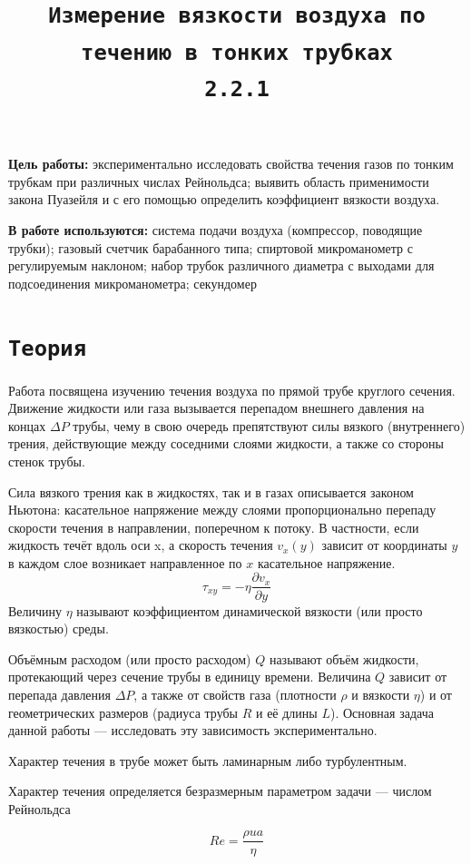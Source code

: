 \documentclass[11pt,a4paper]{article}
\title{\texttt{Измерение вязкости воздуха по течению в тонких трубках \\ 2.2.1}}
\author{}
\date{}
\begin{document}
\maketitle

\textbf{Цель работы:} экспериментально исследовать свойства течения газов по тонким трубкам при различных числах Рейнольдса; выявить область применимости закона Пуазейля и с его помощью определить коэффициент вязкости воздуха.

\textbf{В работе используются:} система подачи воздуха (компрессор, поводящие трубки); газовый счетчик барабанного типа; спиртовой микроманометр с регулируемым наклоном; 
набор трубок различного диаметра с выходами для подсоединения микроманометра; секундомер

\section*{\texttt{Теория}}

Работа посвящена изучению течения воздуха по прямой трубе круглого сечения. Движение жидкости или газа вызывается перепадом внешнего давления на концах $\Delta P$ трубы, чему в свою очередь препятствуют силы вязкого (внутреннего) трения, действующие между соседними слоями жидкости, а также со стороны стенок трубы.

Сила вязкого трения как в жидкостях, так и в газах описывается законом
Ньютона: касательное напряжение между слоями пропорционально перепаду
скорости течения в направлении, поперечном к потоку. В частности, если жидкость течёт вдоль оси x,  а скорость течения $v_{x}(y)$ зависит от координаты $y$  в каждом слое возникает направленное по $x$ касательное напряжение.
\[\tau_{xy} = -\eta \frac{\partial v_x}{\partial y}\]
Величину $\eta$ называют коэффициентом динамической вязкости (или просто вязкостью) среды.

Объёмным расходом (или просто расходом) $Q$ называют объём жидкости,
протекающий через сечение трубы в единицу времени. Величина $Q$ зависит от
перепада давления $\Delta P$, а также от свойств газа (плотности $\rho$ и вязкости $\eta$) и от
геометрических размеров (радиуса трубы $R$ и её длины $L$). Основная задача
данной работы — исследовать эту зависимость экспериментально.

Характер течения в трубе может быть ламинарным либо турбулентным. 

Характер течения определяется безразмерным параметром задачи — числом Рейнольдса

$$ Re = \frac{\rho u a}{\eta}$$ 
\end{document}
